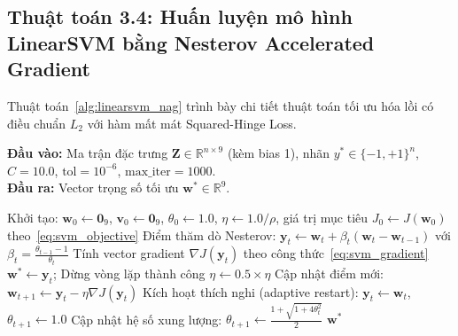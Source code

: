 \subsection{Thuật toán 3.4: Huấn luyện mô hình LinearSVM bằng Nesterov Accelerated Gradient}

Thuật toán~\ref{alg:linearsvm_nag} trình bày chi tiết thuật toán tối ưu hóa lồi có điều chuẩn $L_2$ với hàm mất mát Squared-Hinge Loss.

\begin{algorithm}[!htbp]
\small{}
\caption{Huấn luyện LinearSVM bằng gradient tăng tốc Nesterov (NAG)}
\label{alg:linearsvm_nag}
\textbf{Đầu vào:} Ma trận đặc trưng $\mathbf{Z} \in \mathbb{R}^{n \times 9}$ (kèm bias 1), nhãn $y^* \in \{-1, +1\}^n$, $C = 10.0$, $\text{tol} = 10^{-6}$, $\text{max\_iter} = 1000$. \\
\textbf{Đầu ra:} Vector trọng số tối ưu $\mathbf{w}^* \in \mathbb{R}^9$.
\begin{algorithmic}[1]
\STATE Khởi tạo: $\mathbf{w}_0 \leftarrow \mathbf{0}_9$, $\mathbf{v}_0 \leftarrow \mathbf{0}_9$, $\theta_0 \leftarrow 1.0$, $\eta \leftarrow 1.0 / \rho$, giá trị mục tiêu $J_0 \leftarrow J(\mathbf{w}_0)$ theo~\eqref{eq:svm_objective}
    \STATE Điểm thăm dò Nesterov: $\mathbf{y}_t \leftarrow \mathbf{w}_t + \beta_t (\mathbf{w}_t - \mathbf{w}_{t-1})$ với $\beta_t = \frac{\theta_{t-1} - 1}{\theta_t}$
    \STATE Tính vector gradient $\nabla J(\mathbf{y}_t)$ theo công thức~\eqref{eq:svm_gradient}
        \STATE $\mathbf{w}^* \leftarrow \mathbf{y}_t$; Dừng vòng lặp thành công
    \ENDIF
        \STATE $\eta \leftarrow 0.5 \times \eta$ 
    \ENDWHILE
    \STATE Cập nhật điểm mới: $\mathbf{w}_{t+1} \leftarrow \mathbf{y}_t - \eta \nabla J(\mathbf{y}_t)$
        \STATE Kích hoạt thích nghi (adaptive restart): $\mathbf{y}_t \leftarrow \mathbf{w}_t$, $\theta_{t+1} \leftarrow 1.0$
    \ELSE
        \STATE Cập nhật hệ số xung lượng: $\theta_{t+1} \leftarrow \frac{1 + \sqrt{1 + 4\theta_t^2}}{2}$
    \ENDIF
\ENDFOR
\RETURN $\mathbf{w}^*$
\end{algorithmic}
\end{algorithm}
